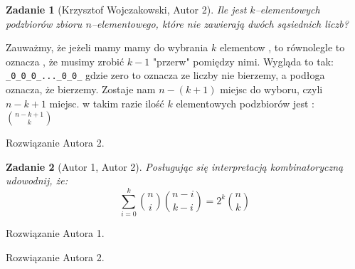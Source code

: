 \documentclass{mwart}
\newtheorem{zad}{Zadanie}[section]
\begin{document}
\begin{zad}[Krzysztof Wojczakowski, Autor 2]
    Ile jest $k$--elementowych podzbiorów zbioru $n$--elementowego, które nie
    zawierają dwóch sąsiednich liczb?
\end{zad}
\begin{mdframed}
    Zauważmy, że jeżeli mamy mamy do wybrania $k$ elementow , to równolegle to oznacza , że
    musimy zrobić $k-1$ "przerw" pomiędzy nimi. Wygląda to tak:
    \verb|_0_0_0_..._0_0_|
    gdzie zero to oznacza ze liczby nie bierzemy, a podłoga oznacza, że bierzemy.
    Zostaje nam $n-(k+1)$ miejsc do wyboru, czyli $n-k+1$ miejsc.
    w takim razie ilość $k$ elementowych podzbiorów jest :
    \( \binom{n-k+1}{k} \)

\end{mdframed}
\begin{mdframed}
    Rozwiązanie Autora 2.
\end{mdframed}


\begin{zad}[Autor 1, Autor 2]
    Posługując się interpretacją kombinatoryczną udowodnij, że:
    \[ \sum_{i=0}^{k} \binom{n}{i} \binom{n-i}{k-i} = 2^k \binom{n}{k} \]
\end{zad}
\begin{mdframed}
    Rozwiązanie Autora 1.
\end{mdframed}
\begin{mdframed}
    Rozwiązanie Autora 2.
\end{mdframed}
\end{document}
